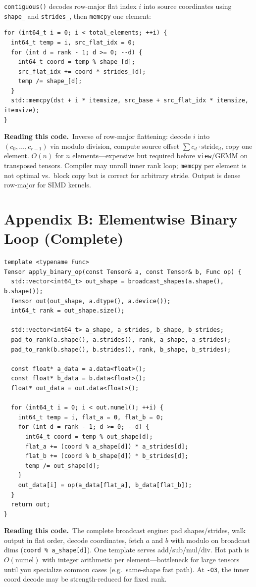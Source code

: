 \documentclass[11pt,a4paper]{article}
\newcommand{\explain}{\par\smallskip\noindent}
\newcommand{\exhead}{\textbf{Reading this code.}\ }
\begin{document}
\texttt{contiguous()} decodes row-major flat index $i$ into source coordinates using
\texttt{shape\_} and \texttt{strides\_}, then \texttt{memcpy} one element:

\begin{lstlisting}[style=cpp]
for (int64_t i = 0; i < total_elements; ++i) {
  int64_t temp = i, src_flat_idx = 0;
  for (int d = rank - 1; d >= 0; --d) {
    int64_t coord = temp % shape_[d];
    src_flat_idx += coord * strides_[d];
    temp /= shape_[d];
  }
  std::memcpy(dst + i * itemsize, src_base + src_flat_idx * itemsize, itemsize);
}
\end{lstlisting}
\explain\exhead Inverse of row-major flattening: decode $i$ into $(c_0,\ldots,c_{r-1})$ via modulo
division, compute source offset $\sum c_d \cdot \text{stride}_d$, copy one element. $O(n)$ for
$n$ elements---expensive but required before \texttt{view}/GEMM on transposed tensors. Compiler
may unroll inner rank loop; \texttt{memcpy} per element is not optimal vs.\ block copy but is
correct for arbitrary stride. Output is dense row-major for SIMD kernels.

\section{Appendix B: Elementwise Binary Loop (Complete)}
\label{app:elementwise}

\begin{lstlisting}[style=cpp]
template <typename Func>
Tensor apply_binary_op(const Tensor& a, const Tensor& b, Func op) {
  std::vector<int64_t> out_shape = broadcast_shapes(a.shape(), b.shape());
  Tensor out(out_shape, a.dtype(), a.device());
  int64_t rank = out_shape.size();

  std::vector<int64_t> a_shape, a_strides, b_shape, b_strides;
  pad_to_rank(a.shape(), a.strides(), rank, a_shape, a_strides);
  pad_to_rank(b.shape(), b.strides(), rank, b_shape, b_strides);

  const float* a_data = a.data<float>();
  const float* b_data = b.data<float>();
  float* out_data = out.data<float>();

  for (int64_t i = 0; i < out.numel(); ++i) {
    int64_t temp = i, flat_a = 0, flat_b = 0;
    for (int d = rank - 1; d >= 0; --d) {
      int64_t coord = temp % out_shape[d];
      flat_a += (coord % a_shape[d]) * a_strides[d];
      flat_b += (coord % b_shape[d]) * b_strides[d];
      temp /= out_shape[d];
    }
    out_data[i] = op(a_data[flat_a], b_data[flat_b]);
  }
  return out;
}
\end{lstlisting}
\explain\exhead The complete broadcast engine: pad shapes/strides, walk output in flat order,
decode coordinates, fetch $a$ and $b$ with modulo on broadcast dims (\texttt{coord \% a\_shape[d]}).
One template serves add/sub/mul/div. Hot path is $O(\text{numel})$ with integer arithmetic per
element---bottleneck for large tensors until you specialize common cases (e.g.\ same-shape fast
path). At \texttt{-O3}, the inner coord decode may be strength-reduced for fixed rank.
\end{document}
